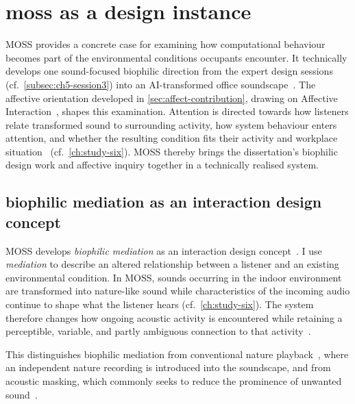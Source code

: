 \section{moss as a design instance}
\label{sec:sound-instance}

MOSS provides a concrete case for examining how computational
behaviour becomes part of the environmental conditions occupants encounter. It technically develops one sound-focused biophilic direction from the expert design sessions~\cite{rao2026biophilic} (cf.~\autoref{subsec:ch5-session3}) into an AI-transformed office soundscape~\cite{rao2027biophilic}.
The affective orientation developed in \autoref{sec:affect-contribution}, drawing on Affective Interaction~\cite{boehner2005affect,boehner2007emotion,lottridge2011affective}, shapes this examination. Attention is directed towards how listeners relate transformed sound to surrounding activity, how system behaviour enters attention, and whether the resulting condition fits their activity and workplace situation~\cite{deacon2024working} (cf.~\autoref{ch:study-six}). MOSS thereby brings the dissertation's biophilic design work and affective inquiry together in a technically realised system.

\subsection{biophilic mediation as an interaction design concept}
\label{subsec:biophilic-mediation}

MOSS develops \emph{biophilic mediation} as an interaction design concept~\cite{rao2027biophilic}. I use \emph{mediation} to describe an altered relationship between a listener and an existing environmental condition. In MOSS, sounds occurring in the indoor environment are transformed into nature-like sound while characteristics of the incoming audio continue to shape what the listener hears (cf.~\autoref{ch:study-six}). The system therefore changes how ongoing acoustic activity is encountered while retaining a perceptible, variable, and partly ambiguous connection to that activity~\cite{gaver2003ambiguity,bustoni2024exploring}.

This distinguishes biophilic mediation from conventional nature playback~\cite{newbold2017nature,yu2016auditory}, where an independent nature recording is introduced into the soundscape, and from acoustic masking, which commonly seeks to reduce the prominence of unwanted sound~\cite{haas2018soundscape,jacobsen2024personal, bustoni2024exploring}.

